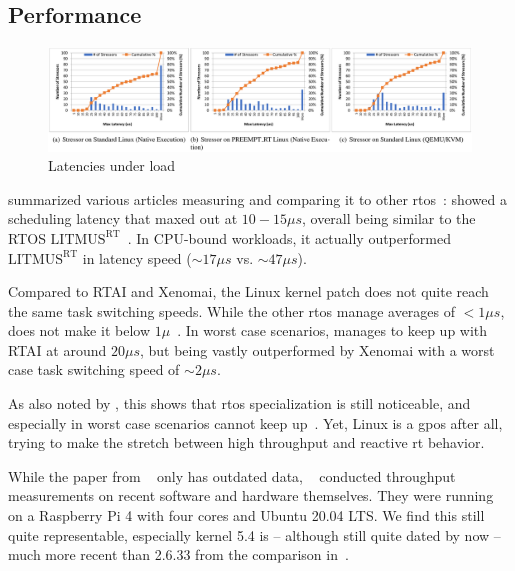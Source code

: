 \documentclass[10pt,twocolumn,a4paper]{article}
\begin{document}
\subsection{Performance}

\begin{figure}[htb]
  \centering
  \includegraphics[scale=.162]{assets/preemptrt_latencies.png}
  \caption{Latencies under load~\cite{li_performance_2023}}
  \label{fig:latencies}
\end{figure}

\citeauthor{reghenzani_realtime_2019} summarized various articles measuring  and comparing it to other \acrshort{rtos}~\cite{reghenzani_realtime_2019}:
 showed a scheduling latency that maxed out at $10 - 15\mu s$, overall being similar to the RTOS $\text{LITMUS}^{\text{RT}}$~\cite{litmusrt}.
In CPU-bound workloads, it actually outperformed $\text{LITMUS}^{\text{RT}}$ in latency speed ($\sim 17\mu s$ vs. $\sim 47\mu s$).

Compared to RTAI and Xenomai, the Linux kernel patch does not quite reach the same task switching speeds.
While the other \acrshort{rtos} manage averages of $<1\mu s$,  does not make it below $1 \mu$~\cite{reghenzani_realtime_2019}.
In worst case scenarios,  manages to keep up with RTAI at around $20\mu s$, but being vastly outperformed by Xenomai with a worst case task switching speed of $\sim 2\mu s$.

As also noted by \citeauthor{reghenzani_realtime_2019}, this shows that \acrshort{rtos} specialization is still noticeable, and especially in worst case scenarios  cannot keep up~\cite{reghenzani_realtime_2019}.
Yet, Linux is a \acrfull{gpos} after all, trying to make the stretch between high throughput and reactive \acrshort{rt} behavior.

While the paper from \citeauthor{reghenzani_realtime_2019}~\cite{reghenzani_realtime_2019} only has outdated data, \citeauthor{li_performance_2023}~\cite{li_performance_2023} conducted throughput measurements on recent software and hardware themselves.
They were running on a Raspberry Pi 4 with four cores and Ubuntu 20.04 LTS.
We find this still quite representable, especially kernel 5.4 is -- although still quite dated by now -- much more recent than 2.6.33 from the comparison in~\cite{reghenzani_realtime_2019}.
\end{document}
